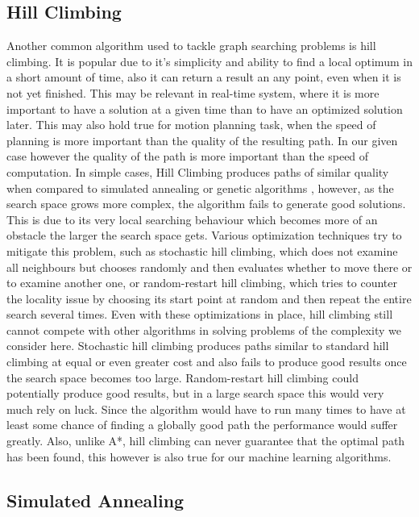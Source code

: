 \subsection{Hill Climbing}
\label{sec:hill_climbing}

Another common algorithm used to tackle graph searching problems is hill climbing. It is popular due to it's simplicity and ability to find a local optimum in a short amount of time, also it can return a result an any point, even when it is not yet finished. This may be relevant in real-time system, where it is more important to have a solution at a given time than to have an optimized solution later. This may also hold true for motion planning task, when the speed of planning is more important than the quality of the resulting path. In our given case however the quality of the path is more important than the speed of computation. In simple cases, Hill Climbing produces paths of similar quality when compared to simulated annealing or genetic algorithms \cite{8}, however, as the search space grows more complex, the algorithm fails to generate good solutions. This is due to its very local searching behaviour which becomes more of an obstacle the larger the search space gets. Various optimization techniques try to mitigate this problem, such as stochastic hill climbing, \label{sec:stochastic_hill_climbing} which does not examine all neighbours but chooses randomly and then evaluates whether to move there or to examine another one, or random-restart hill climbing, which tries to counter the locality issue by choosing its start point at random and then repeat the entire search several times. Even with these optimizations in place, hill climbing still cannot compete with other algorithms in solving problems of the complexity we consider here. Stochastic hill climbing produces paths similar to standard hill climbing at equal or even greater cost \cite{8} and also fails to produce good results once the search space becomes too large. Random-restart hill climbing could potentially produce good results, but in a large search space this would very much rely on luck. Since the algorithm would have to run many times to have at least some chance of finding a globally good path the performance would suffer greatly. Also, unlike A*, hill climbing can never guarantee that the optimal path has been found, this however is also true for our machine learning algorithms.

\subsection{Simulated Annealing}
\label{sec:simulated_annealing}

